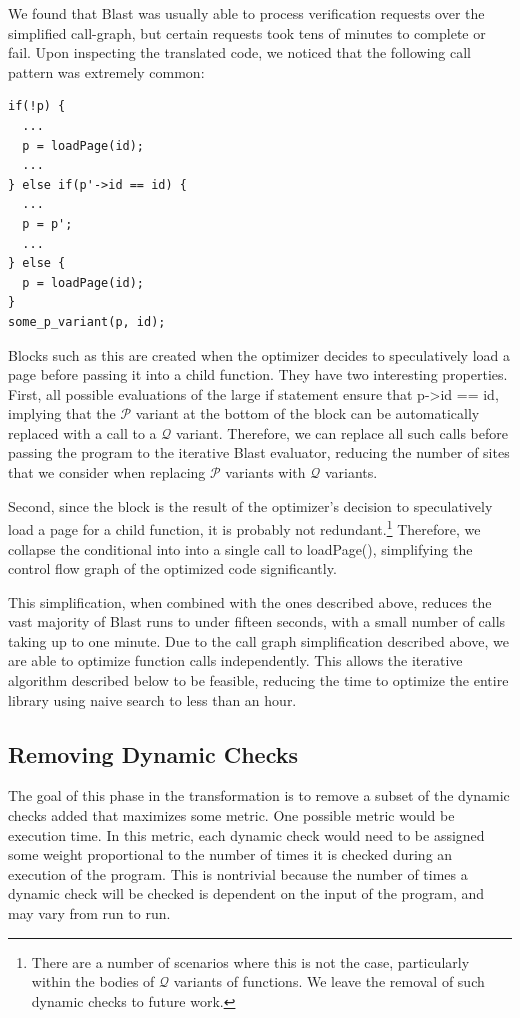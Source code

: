 \documentclass[10pt,letterpaper,twocolumn,english]{article}
\newcommand{\pin}{loadPage()\xspace}
\newcommand{\fP}{{$\mathcal P$}\xspace}
\newcommand{\fQ}{{$\mathcal Q$}\xspace}
\begin{document}
We found that Blast was usually able to process verification requests
over the simplified call-graph, but certain requests took tens of
minutes to complete or fail.  Upon inspecting the translated code, we
noticed that the following call pattern was extremely common:

\begin{verbatim}
if(!p) { 
  ...
  p = loadPage(id);
  ...
} else if(p'->id == id) {
  ...
  p = p';
  ...
} else {
  p = loadPage(id);
}
some_p_variant(p, id);
\end{verbatim}

Blocks such as this are created when the optimizer decides to
speculatively load a page before passing it into a child function.
They have two interesting properties.  First, all possible evaluations
of the large if statement ensure that p->id == id, implying that the
\fP variant at the bottom of the block can be automatically replaced
with a call to a \fQ variant.  Therefore, we can replace all such calls
before passing the program to the iterative Blast evaluator, reducing
the number of sites that we consider when replacing \fP variants with
\fQ variants.

Second, since the block is the result of the optimizer's decision to
speculatively load a page for a child function, it is probably not
redundant.\footnote{There are a number of scenarios where this is not
the case, particularly within the bodies of \fQ variants of functions.
We leave the removal of such dynamic checks to future work.}
Therefore, we collapse the conditional into into a single call to
\pin, simplifying the control flow graph of the optimized code
significantly.  

This simplification, when combined with the ones described above,
reduces the vast majority of Blast runs to under fifteen seconds, with
a small number of calls taking up to one minute.  Due to the call graph
simplification described above, we are able to optimize function calls
independently.  This allows the iterative algorithm described below to
be feasible, reducing the time to optimize the entire library using
naive search to less than an hour.

\subsection{Removing Dynamic Checks}
\label{delta}
The goal of this phase in the transformation is to remove a subset of
the dynamic checks added that maximizes some metric.  One possible
metric would be execution time.  In this metric, each dynamic check
would need to be assigned some weight proportional to the number of
times it is checked during an execution of the program.  This is
nontrivial because the number of times a dynamic check will be
checked is dependent on the input of the program, and may vary from run
to run. 
\end{document}
